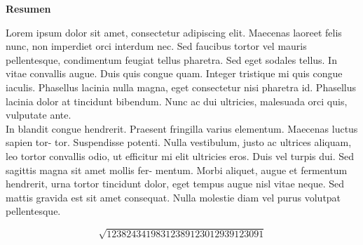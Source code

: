 \newpage
\begin{center}
    {\Large \textbf{Resumen}}
\end{center}
\noindent Lorem ipsum dolor sit amet, consectetur adipiscing elit. Maecenas laoreet felis nunc, non
imperdiet orci interdum nec. Sed faucibus tortor vel mauris pellentesque, condimentum feugiat
tellus pharetra. Sed eget sodales tellus. In vitae convallis augue. Duis quis congue quam. Integer
tristique mi quis congue iaculis. Phasellus lacinia nulla magna, eget consectetur nisi pharetra
id. Phasellus lacinia dolor at tincidunt bibendum. Nunc ac dui ultricies, malesuada orci quis,
vulputate ante.\\
\indent In blandit congue hendrerit. Praesent fringilla varius elementum. Maecenas luctus sapien tor-
tor. Suspendisse potenti. Nulla vestibulum, justo ac ultrices aliquam, leo tortor convallis odio,
ut efficitur mi elit ultricies eros. Duis vel turpis dui. Sed sagittis magna sit amet mollis fer-
mentum. Morbi aliquet, augue et fermentum hendrerit, urna tortor tincidunt dolor, eget tempus
augue nisl vitae neque. Sed mattis gravida est sit amet consequat. Nulla molestie diam vel purus
volutpat pellentesque.

\begin{equation}
    \sqrt{12382434198312389123012939123091}
\end{equation}

\newpage
\thispagestyle{empty} \mbox{}
\thispagestyle{empty}
